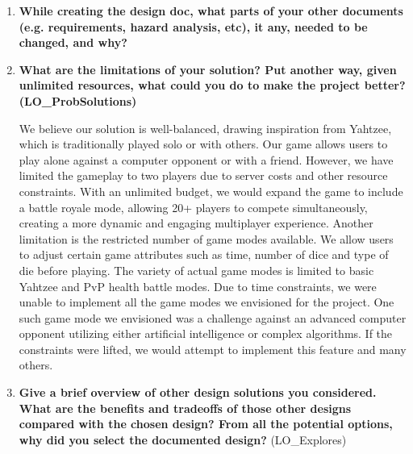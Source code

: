 \documentclass[12pt, titlepage]{article}
\begin{document}
\begin{enumerate}
  \item \textbf{While creating the design doc, what parts of your other documents (e.g.
  requirements, hazard analysis, etc), it any, needed to be changed, and why?}
  \item \textbf{What are the limitations of your solution?  Put another way, given
  unlimited resources, what could you do to make the project better? (LO\_ProbSolutions)}

  We believe our solution is well-balanced, drawing inspiration from Yahtzee, which is traditionally played solo or with others. Our game allows users to play alone against a computer opponent or with a friend. However, we have limited the gameplay to two players due to server costs and other resource constraints. With an unlimited budget, we would expand the game to include a battle royale mode, allowing 20+ players to compete simultaneously, creating a more dynamic and engaging multiplayer experience. Another limitation is the restricted number of game modes available. We allow users to adjust certain game attributes such as time, number of dice and type of die before playing. The variety of actual game modes is limited to basic Yahtzee and PvP health battle modes. Due to time constraints, we were unable to implement all the game modes we envisioned for the project. One such game mode we envisioned was a challenge against an advanced computer opponent utilizing either artificial intelligence or complex algorithms. If the constraints were lifted, we would attempt to implement this feature and many others.
  
  \item \textbf{Give a brief overview of other design solutions you considered.  What
  are the benefits and tradeoffs of those other designs compared with the chosen
  design?  From all the potential options, why did you select the documented design?}
  (LO\_Explores)
\end{enumerate}
\end{document}
